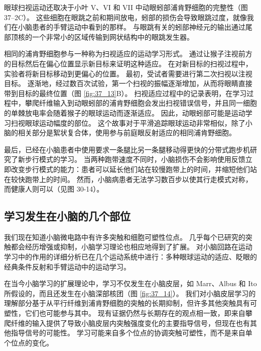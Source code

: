 眼球扫视运动还取决于小叶 V、VI 和 VII 中动眼蚓部浦肯野细胞的完整性（图 37–2C）。 这些细胞在眼跳之前和期间放电，蚓部的损伤会导致眼跳过度，就像我们在小脑患者的手臂运动中看到的那样。 与眼跳有关的蚓部神经元的输出通过尾部顶核的一个非常小的区域传输到网状结构中的眼跳发生器。

相同的浦肯野细胞参与一种称为扫视适应的运动学习形式。 通过让猴子注视前方的目标然后在偏心位置显示新目标来证明这种适应。 在对新目标的扫视过程中，实验者将新目标移动到更偏心的位置。 最初，受试者需要进行第二次扫视以注视目标。 逐渐地，经过数百次试验，第一个扫视的振幅逐渐增加，从而将眼睛直接带到目标的最终位置（图 \ref{fig:37_13}B）。 扫视适应过程中的记录表明，在学习过程中，攀爬纤维输入到动眼蚓部的浦肯野细胞会发出扫视错误信号，并且同一细胞的单棘放电率会随着猴子的眼球运动而逐渐适应。 因此，动眼蚓部可能是运动学习扫视眼球运动幅度的部位。 这个故事对于平滑追踪眼球运动非常相似，除了小脑的相关部分是絮状复合体，使用参与前庭眼反射适应的相同浦肯野细胞。

最后，已经在小脑患者中使用要求一条腿比另一条腿移动得更快的分带式跑步机研究了新步行模式的学习。 当两种跑带速度不同时，小脑损伤不会影响使用反馈立即改变步行模式的能力：患者可以延长他们站在较慢跑带上的时间，并缩短他们站在较快跑带上的时间。 然而，小脑病患者无法学习数百步以使其行走模式对称，而健康人则可以（见图 30-14）。

\subsection{学习发生在小脑的几个部位}

我们现在知道小脑微电路中有许多突触和细胞可塑性位点。 几乎每个已研究的突触都会经历增强或抑制，小脑学习理论也相应地得到了扩展。 对小脑回路在运动学习中的作用的详细分析已在几个运动系统中进行：多种眼球运动的适应、眨眼的经典条件反射和手臂运动中的运动学习。

在当今小脑学习的扩展理论中，学习不仅发生在小脑皮层，如 Marr、Albus 和 Ito 所假设的，而且还发生在小脑深部核团（图 \ref{fig:37_14}）。 
我们对小脑皮层学习的理解部分基于从平行纤维到浦肯野细胞的突触的长期抑制，但许多其他突触具有可塑性，它们也可能参与其中。 现有证据仍然与长期存在的观点相一致，即来自攀爬纤维的输入提供了导致小脑皮层内突触强度变化的主要指导信号，但现在也有其他指导信号的可能性。 学习可能来自多个位点的协调突触可塑性，而不是来自单个位点的变化。

